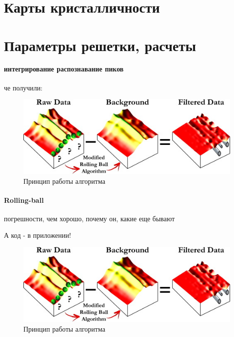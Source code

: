 	\section{Карты кристалличности}
	
	\section{Параметры решетки, расчеты}
	

	
	\paragraph{интегрирование распознавание пиков}
	че получили:
		\begin{figure}
    \includegraphics[width=\textwidth]{fig/rolling-ball.jpg}
    \caption{Принцип работы алгоритма}
    \label{fig:rolling-ball}
\end{figure}
	
	\paragraph{Rolling-ball}
	погрешности, чем хорошо, почему он, какие еще бывают
	
	А код - в приложении!
	
	\begin{figure}
    \includegraphics[width=\textwidth]{fig/rolling-ball.jpg}
    \caption{Принцип работы алгоритма}
    \label{fig:rolling-ball}
\end{figure}

